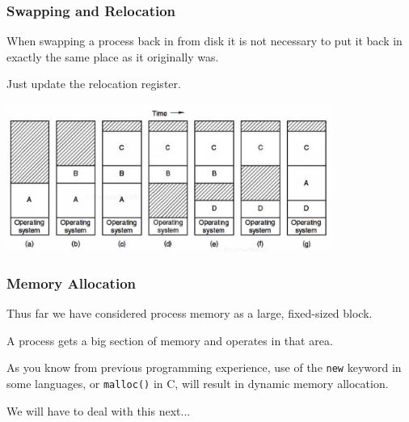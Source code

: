 \begin{frame}
\frametitle{Swapping and Relocation}

When swapping a process back in from disk it is not necessary to put it back in exactly the same place as it originally was.

Just update the relocation register.

\begin{center}
\includegraphics[width=0.8\textwidth]{images/swapping2.png}
\end{center}

\end{frame}

\begin{frame}
\frametitle{Memory Allocation}

Thus far we have considered process memory as a large, fixed-sized block.

 A process gets a big section of memory and operates in that area.
 
As you know from previous programming experience, use of the \texttt{new} keyword in some languages, or \texttt{malloc()} in C, will result in dynamic memory allocation. 

We will have to deal with this next...

\end{frame}


